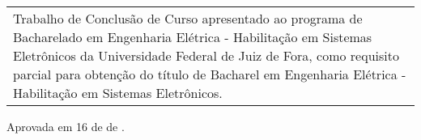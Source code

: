 \thispagestyle{empty}

\begin{center}

\Autor

\vfill

\TITULO

\vfill

\end{center}

\begin{flushright}
    \begin{tabular}{p{8.0cm}}
    Trabalho de Conclusão de Curso apresentado ao programa de Bacharelado em Engenharia Elétrica - Habilitação em Sistemas Eletrônicos da Universidade Federal de Juiz de Fora, como requisito parcial para obtenção do título de Bacharel em Engenharia Elétrica - Habilitação em Sistemas Eletrônicos.
    \end{tabular}
\end{flushright}

\vspace{1.0cm}

\noindent Aprovada em 16 de \Mes de \Ano.\\

